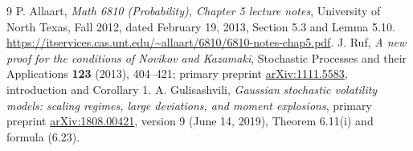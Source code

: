 \documentclass[11pt]{article}
\theoremstyle{remark}\newtheorem{remark}[theorem]{Remark}
\begin{document}
\begin{thebibliography}{9}
 P. Allaart, \emph{Math 6810 (Probability), Chapter 5 lecture notes}, University of North Texas, Fall 2012, dated February 19, 2013, Section 5.3 and Lemma 5.10. \url{https://itservices.cas.unt.edu/~allaart/6810/6810-notes-chap5.pdf}.
 J. Ruf, \emph{A new proof for the conditions of Novikov and Kazamaki}, Stochastic Processes and their Applications \textbf{123} (2013), 404--421; primary preprint \href{https://arxiv.org/abs/1111.5583}{arXiv:1111.5583}, introduction and Corollary 1.
 A. Gulisashvili, \emph{Gaussian stochastic volatility models: scaling regimes, large deviations, and moment explosions}, primary preprint \href{https://arxiv.org/pdf/1808.00421}{arXiv:1808.00421}, version 9 (June 14, 2019), Theorem 6.11(i) and formula (6.23).
\end{thebibliography}
\end{document}
